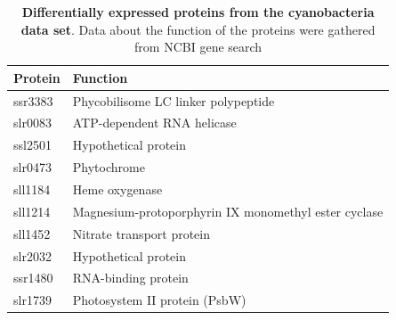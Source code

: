\begin{center}
\begin{table}[H]
\caption{\textbf{Differentially expressed proteins from the cyanobacteria data set}. Data about the function of the proteins were gathered from NCBI gene search \cite{ncbi-search}}
\begin{tabular}{ l l }
\toprule
Protein & Function \\ \midrule
ssr3383 & Phycobilisome LC linker polypeptide \\ [0.5ex]
slr0083 & ATP-dependent RNA helicase \\ [0.5ex]
ssl2501 & Hypothetical protein \\ [0.5ex]
slr0473 & Phytochrome \\ [0.5ex]
sll1184 & Heme oxygenase \\ [0.5ex]
sll1214 & Magnesium-protoporphyrin IX monomethyl ester cyclase \\ [0.5ex]
sll1452 & Nitrate transport protein \\ [0.5ex]
slr2032 & Hypothetical protein \\ [0.5ex]
ssr1480 & RNA-binding protein \\ [0.5ex]
slr1739 & Photosystem II protein (PsbW) \\ \bottomrule
\end{tabular}
\centering
\label{table:cyano-proteins}
\end{table}
\end{center}

